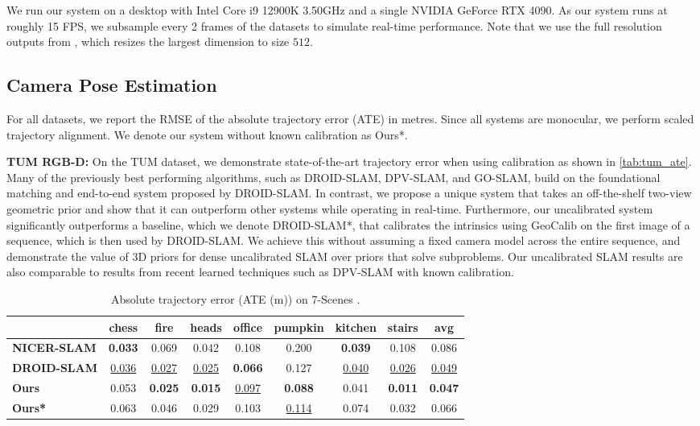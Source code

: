 \documentclass[10pt,twocolumn,letterpaper]{article}
\begin{document}
We run our system on a desktop with Intel Core i9 12900K 3.50GHz and a single  NVIDIA GeForce RTX 4090.  As our system runs at roughly 15 FPS, we subsample every 2 frames of the datasets to simulate real-time performance.  Note that we use the full resolution outputs from \master, which resizes the largest dimension to size $512$.

\subsection{Camera Pose Estimation}\label{sec:camera-pose-estimation}
For all datasets, we report the RMSE of the absolute trajectory error (ATE) in metres.  Since all systems are monocular, we perform scaled trajectory alignment.  We denote our system without known calibration as Ours*.

\textbf{TUM RGB-D:} On the TUM dataset, we demonstrate state-of-the-art trajectory error when using calibration as shown in \cref{tab:tum_ate}.  Many of the previously best performing algorithms, such as DROID-SLAM, DPV-SLAM, and GO-SLAM, build on the foundational matching and end-to-end system proposed by DROID-SLAM.  In contrast, we propose a unique system that takes an off-the-shelf two-view geometric prior and show that it can outperform other systems while operating in real-time.  Furthermore, our uncalibrated system significantly outperforms a baseline, which we denote DROID-SLAM*, that calibrates the intrinsics using GeoCalib \cite{veicht2024geocalib} on the first image of a sequence, which is then used by DROID-SLAM.  We achieve this without assuming a fixed camera model across the entire sequence, and demonstrate the value of 3D priors for dense uncalibrated SLAM over priors that solve subproblems.  Our uncalibrated SLAM results are also comparable to results from recent learned techniques such as DPV-SLAM with known calibration.

\setlength{\tabcolsep}{2pt}
\begin{table}[t]
\centering
\caption{Absolute trajectory error (ATE (m)) on 7-Scenes \cite{shotton_7scenes_2013}.}\label{tab:7_scenes}
\scriptsize
\begin{tabular}{l|cccccccc} %
&\textbf{chess} &\textbf{fire} &\textbf{heads} &\textbf{office} &\textbf{pumpkin} &\textbf{kitchen} &\textbf{stairs} &\textbf{avg} \\
\hline
\textbf{NICER-SLAM} &\textbf{0.033} &0.069 &0.042 &0.108 &0.200 &\textbf{0.039} &0.108 &0.086 \\
\textbf{DROID-SLAM} &\underline{0.036} &\underline{0.027} &\underline{0.025} &\textbf{0.066} &0.127 &\underline{0.040} &\underline{0.026} &\underline{0.049} \\
\textbf{Ours} &0.053 &\textbf{0.025} &\textbf{0.015} &\underline{0.097} &\textbf{0.088} &0.041 &\textbf{0.011} & \textbf{0.047} \\
\textbf{Ours*} &0.063 &0.046 &0.029 &0.103 &\underline{0.114} &0.074 &0.032 &0.066 \\
\bottomrule
\end{tabular}
\end{table}
\end{document}
